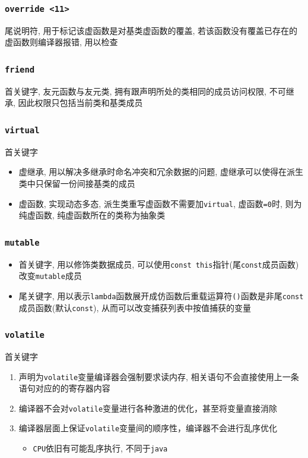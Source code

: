 \subsubsection{\tt override <11>}
尾说明符, 用于标记该虚函数是对基类虚函数的覆盖, 若该函数没有覆盖已存在的虚函数则编译器报错, 用以检查
\subsubsection{\tt friend}
首关键字, 友元函数与友元类, 拥有跟声明所处的类相同的成员访问权限, 不可继承, 因此权限只包括当前类和基类成员
\subsubsection{\tt virtual}
首关键字
\begin{itemize}
	\item 虚继承, 用以解决多继承时命名冲突和冗余数据的问题, 虚继承可以使得在派生类中只保留一份间接基类的成员
	\item 虚函数, 实现动态多态, 派生类重写虚函数不需要加{\tt virtual}, 虚函数{\tt =0}时, 则为纯虚函数, 纯虚函数所在的类称为抽象类
\end{itemize}
\subsubsection{\tt mutable}
\begin{itemize}
	\item 首关键字, 用以修饰类数据成员, 可以使用{\tt const this}指针(尾{\tt const}成员函数)改变{\tt mutable}成员
	\item 尾关键字, 用以表示{\tt lambda}函数展开成仿函数后重载运算符{\tt ()}函数是非尾{\tt const}成员函数(默认{\tt const}), 
			从而可以改变捕获列表中按值捕获的变量
\end{itemize}

\subsubsection{\tt volatile}
首关键字
\begin{enumerate}
	\item 声明为{\tt volatile}变量编译器会强制要求读内存, 相关语句不会直接使用上一条语句对应的的寄存器内容
	\item 编译器不会对{\tt volatile}变量进行各种激进的优化，甚至将变量直接消除
	\item 编译器层面上保证{\tt volatile}变量间的顺序性，编译器不会进行乱序优化
	\begin{itemize}
		\item {\tt CPU}依旧有可能乱序执行, 不同于{\tt java}
	\end{itemize}
\end{enumerate}

